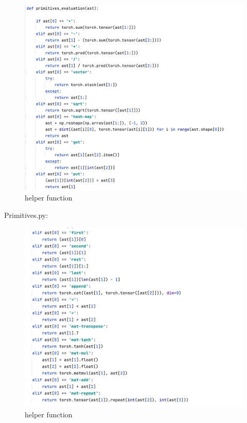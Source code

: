 \documentclass{article}
\begin{document}
\begin{enumerate}
\begin{figure}[!htp]
	\centering
	\includegraphics[scale=0.6]{../figs/primitive_code2}
	\caption{helper function}
\end{figure}

Primitives.py:
\begin{figure}[!htp]
	\centering
	\includegraphics[scale=0.6]{../figs/primitive_code3}
	\caption{helper function}
\end{figure}
\end{enumerate}
\end{document}
